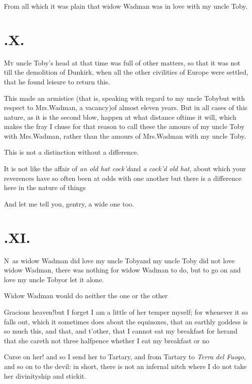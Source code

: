 \documentclass{article}
\begin{document}
\newpage
From all which it was plain that widow Wadman was in love
with my uncle Toby.

\section{.\enspace X.}

\lettrine{M}{y} uncle Toby’s head at
that time was full of other matters,\break
so that it was not till the
demolition of Dunkirk, when all the other civilities of
Europe were settled, that he found leisure to return
this.

This made an armistice (that is, speaking with regard to my uncle Toby\tsk but with
respect to Mrs.\@ Wadman, a vacancy)\tsk of almost eleven years. But in all cases of
this nature, as it is the second blow, happen at what distance of\pb time it will,
which makes the fray\tsh\break 
I chuse for that reason to call these\break 
the amours of my uncle Toby with\break
Mrs.\@ Wadman, rather than the amours\break
of Mrs.\@ Wadman with my uncle Toby.

This is not a distinction without a difference.

It is not like the affair of \textit{an old hat cock’d}\tsk and
\textit{a cock’d
old hat}, about which your reverences have so often been at odds with one another
\tsh but there is a difference here in the nature of\break
things\tsh

And let me tell you, gentry, a wide one too.

\newpage
\section{.\enspace XI.}

\lettrine{N}{\,} as widow Wadman did love
my uncle Toby\tsh and my uncle Toby did not
love widow Wadman, there was nothing for widow Wadman
to do, but to go on and love my uncle Toby\tsh or
let it alone.

Widow Wadman would do neither the one or the other\tsk

\tsk Gracious heaven!\tsk but I forget I am a
little of her temper myself; for whenever it so falls out, which it
sometimes does about the equinoxes, that an earthly goddess is so
much this, and that, and t’other, that I cannot eat my\pb
breakfast for her\tsh and that she careth not three
halfpence whether I eat my breakfast or no\tsh

\tsh Curse on her! and so I send her to Tartary,
and from Tartary to \textit{Terra del Fuogo}, and so on to the
devil: in short, there is not an infernal nitch where I do not take
her divinityship and stick\break it.
\end{document}
